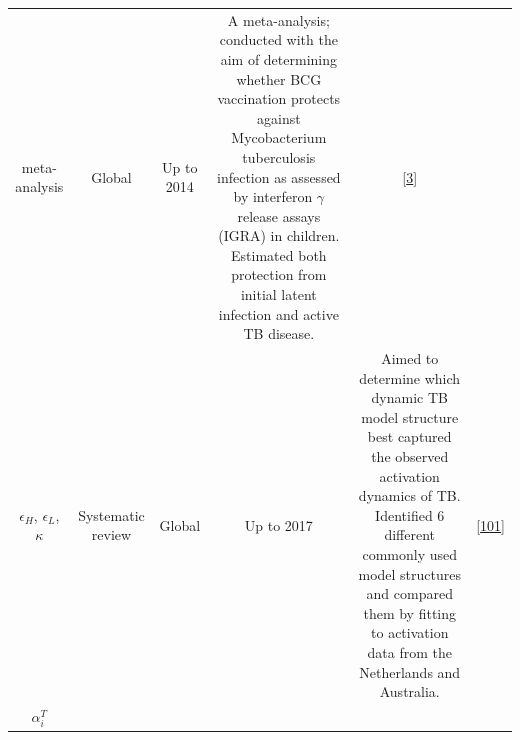 \documentclass[11pt,twoside]{bristolthesis}
\begin{document}
\begin{longtable}[]{@{}cccccc@{}}
\begin{minipage}[t]{0.10\columnwidth}
  meta-analysis\strut
  \end{minipage} & \begin{minipage}[t]{0.07\columnwidth}\centering
  Global\strut
  \end{minipage} & \begin{minipage}[t]{0.07\columnwidth}\centering
  Up to
  2014\strut
  \end{minipage} & \begin{minipage}[t]{0.27\columnwidth}\centering
  A meta-analysis; conducted with the aim
  of determining whether BCG vaccination
  protects against Mycobacterium
  tuberculosis infection as assessed by
  interferon \(\gamma\) release assays
  (IGRA) in children. Estimated both
  protection from initial latent infection
  and active TB disease.\strut
  \end{minipage} & \begin{minipage}[t]{0.11\columnwidth}\centering
  {[}\protect\hyperlink{ref-Roy2014}{3}{]}\strut
  \end{minipage}\tabularnewline
  \begin{minipage}[t]{0.21\columnwidth}\centering
  \(\epsilon_H\),
  \(\epsilon_L\),
  \(\kappa\)\strut
  \end{minipage} & \begin{minipage}[t]{0.10\columnwidth}\centering
  Systematic
  review\strut
  \end{minipage} & \begin{minipage}[t]{0.07\columnwidth}\centering
  Global\strut
  \end{minipage} & \begin{minipage}[t]{0.07\columnwidth}\centering
  Up to
  2017\strut
  \end{minipage} & \begin{minipage}[t]{0.27\columnwidth}\centering
  Aimed to determine which dynamic TB
  model structure best captured the
  observed activation dynamics of TB.
  Identified 6 different commonly used
  model structures and compared them by
  fitting to activation data from the
  Netherlands and Australia.\strut
  \end{minipage} & \begin{minipage}[t]{0.11\columnwidth}\centering
  {[}\protect\hyperlink{ref-Ragonnet2017}{101}{]}\strut
  \end{minipage}\tabularnewline
  \begin{minipage}[t]{0.21\columnwidth}\centering
  \(\alpha_i^T\)\strut
  \end{minipage} & \begin{minipage}[t]{0.10\columnwidth}\centering

\end{minipage}
\end{longtable}
\end{document}
